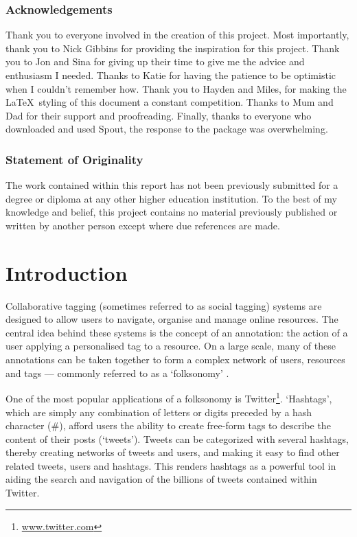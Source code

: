 \documentclass[11pt,a4paper]{report}
\begin{document}
\tableofcontents

\pagebreak

\subsection*{Acknowledgements}
Thank you to everyone involved in the creation of this project. Most importantly, thank you to Nick Gibbins for providing the inspiration for this project. Thank you to Jon and Sina for giving up their time to give me the advice and enthusiasm I needed. Thanks to Katie for having the patience to be optimistic when I couldn't remember how. Thank you to Hayden and Miles, for making the \LaTeX\ styling of this document a constant competition. Thanks to Mum and Dad for their support and proofreading. Finally, thanks to everyone who downloaded and used Spout, the response to the package was overwhelming.

\subsection*{Statement of Originality}

The work contained within this report has not been previously submitted for a degree or diploma at any other higher education institution. To the best of my knowledge and belief, this project contains no material previously published or written by another person except where due references are made.

\pagebreak

\setcounter{page}{1}

\chapter{Introduction}
\label{chap:introduction}
Collaborative tagging (sometimes referred to as social tagging) systems are designed to allow users to navigate, organise and manage online resources. The central idea behind these systems is the concept of an annotation: the action of a user applying a personalised tag to a resource. On a large scale, many of these annotations can be taken together to form a complex network of users, resources and tags --- commonly referred to as a `folksonomy' \parencite{Xu:2008}.

One of the most popular applications of a folksonomy is Twitter\footnote{\url{www.twitter.com}}. `Hashtags', which are simply any combination of letters or digits preceded by a hash character (\#), afford users the ability to create free-form tags to describe the content of their posts (`tweets'). Tweets can be categorized with several hashtags, thereby creating networks of tweets and users, and making it easy to find other related tweets, users and hashtags. This renders hashtags as a powerful tool in aiding the search and navigation of the billions of tweets contained within Twitter.
\end{document}
